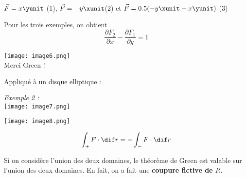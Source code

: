 $\vec F=x\yunit$ (1), $\vec F = -y \xunit$(2) et $\vec F = 0.5 ( -y \xunit +x \yunit )$ (3)

Pour les trois exemples, on obtient \[\frac{\partial F_2}{\partial x}- \frac{\partial F_1}{\partial y} = 1\]

\texttt{[image: image6.png]}\\

Merci Green !

Appliqué à un disque elliptique :

\textit{
Exemple 2 : }\\
\texttt{[image: image7.png]}\\

\begin{myrem}

\texttt{[image: image8.png]}

\[\int_+ F\cdot \dif r = - \int_- F\cdot \dif r\]

Si on considère l'union des deux domaines, le théorème de Green est valable sur l'union des deux domaines. En fait, on a fait une \textbf{coupure fictive de $R$}.
\end{myrem}
